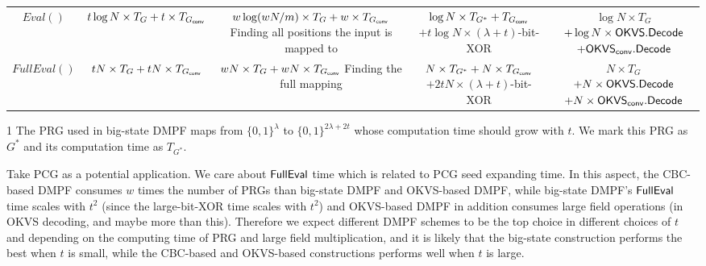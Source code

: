 \begin{table*}
{\begin{threeparttable}
\begin{tabular}{ccccc}
        \cline{1-5}

				$Eval()$ & $t\log N\times T_G+t\times T_{G_{\sf conv}}$ &\makecell{$w\log(wN/m)\times T_G + w\times T_{G_{\sf conv}}$\\Finding all positions the input is mapped to} & \makecell{$\log N\times T_{G^*} + T_{G_{\sf conv}}$\\$+t\log N \times (\lambda+t)$-bit-XOR}&\makecell{$\log N\times T_G$ \\$+\log N\times{\sf OKVS}.{\sf Decode}$\\ $+\OKVS_{\sf conv}.\Decode$} \\

        \cline{1-5}

				$FullEval()$ & $tN\times T_G+tN\times T_{G_{\sf conv}}$ &\makecell{$wN\times T_G+ wN\times T_{G_{\sf conv}}$\\Finding the full mapping} & \makecell{$N\times T_{G^*} + N\times T_{G_{\sf conv}}$\\$+2tN\times (\lambda+t)$-bit-XOR }& \makecell{$N\times T_G$ \\ $+N\times{\sf OKVS}.{\sf Decode}$\\$+N\times {\sf OKVS}_{\sf conv}.{\sf Decode}$} \\
        \bottomrule
			\end{tabular}	
      \begin{tablenotes}
        \item [1] The PRG used in big-state DMPF maps from $\{0,1\}^\lambda$ to $\{0,1\}^{2\lambda+2t}$ whose computation time should grow with $t$. We mark this PRG as $G^*$ and its computation time as $T_{G^*}$. 
        \end{tablenotes}
    \end{threeparttable}
    }
	\end{table*}

Take PCG as a potential application. We care about ${\sf FullEval}$ time which is related to PCG seed expanding time. In this aspect, the CBC-based DMPF consumes $w$ times the number of PRGs than big-state DMPF and OKVS-based DMPF, while big-state DMPF's ${\sf FullEval}$ time scales with $t^2$ (since the large-bit-XOR time scales with $t^2$) and OKVS-based DMPF in addition consumes large field operations (in OKVS decoding, and maybe more than this). Therefore we expect different DMPF schemes to be the top choice in different choices of $t$ and depending on the computing time of PRG and large field multiplication, and it is likely that the big-state construction performs the best when $t$ is small, while the CBC-based and OKVS-based constructions performs well when $t$ is large. 

